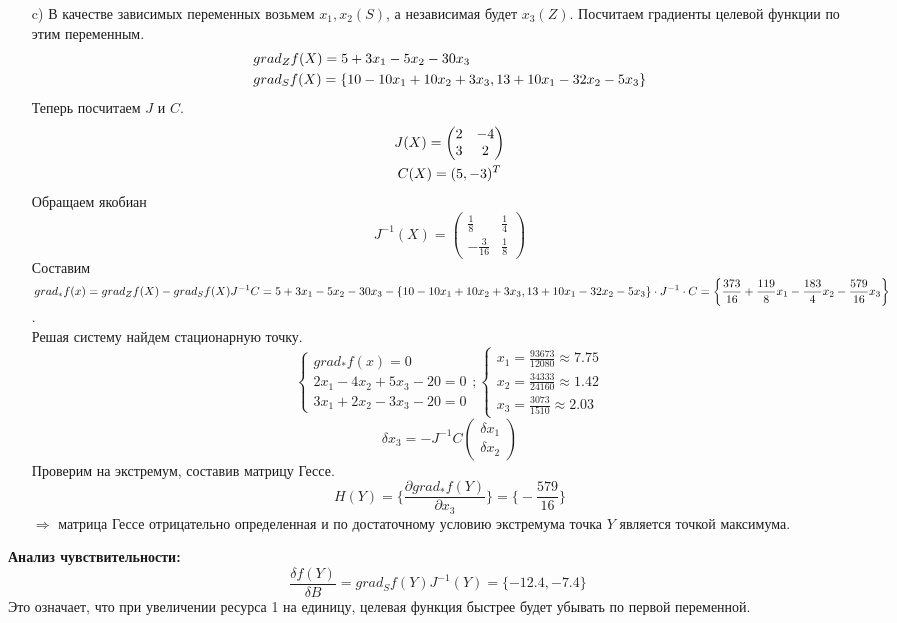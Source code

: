 \documentclass[12pt]{article}
\begin{document}
\begin{enumerate}
\item[c)] В качестве зависимых переменных возьмем $x_1,x_2(S)$, а независимая будет $x_3(Z)$. Посчитаем градиенты целевой функции по этим переменным.
\begin{align}
  &grad_Zf(X)=5+3x_1-5x_2-30x_3\\
  &grad_Sf(X)=\{10-10x_1+10x_2+3x_3,13+10x_1-32x_2-5x_3\}\notag
\end{align}
Теперь посчитаем $J$ и $C$.
\begin{gather}
  J(X)=\begin{pmatrix}
    2&-4\\3&2
  \end{pmatrix}\\
  C(X)=(5,-3)^T\notag
\end{gather}
Обращаем якобиан
\begin{equation}
  J^{-1}(X)=\begin{pmatrix}
    \frac{1}{8}&\frac{1}{4}\\
    -\frac{3}{16}&\frac{1}{8}
  \end{pmatrix}
\end{equation}
Составим $\displaystyle grad_{*}f(x)=grad_Zf(X)-grad_Sf(X)J^{-1}C=\\
5+3x_1-5x_2-30x_3-\{10-10x_1+10x_2+3x_3,13+10x_1-32x_2-5x_3\}\cdot J^{-1}\cdot C=\bigg\{\frac{373}{16}+\frac{119}{8}x_1-\frac{183}{4}x_2-
\frac{579}{16}x_3\bigg\}$.\\
Решая систему найдем стационарную точку.
\begin{equation}
  \begin{cases}
    grad_{*}f(x)=0\\
    2x_1-4x_2+5x_3-20=0\\
    3x_1+2x_2-3x_3-20=0
  \end{cases};
  \begin{cases}
    x_1=\frac{93673}{12080}\approx 7.75\\
    x_2=\frac{34333}{24160}\approx 1.42\\
    x_3=\frac{3073}{1510}\approx 2.03
  \end{cases}
\end{equation}
\begin{equation}
  \delta x_3=-J^{-1}C\begin{pmatrix}
    \delta x_1\\\delta x_2
\end{pmatrix}
\end{equation}
Проверим на экстремум, составив матрицу Гессе.
\begin{equation}
  H(Y)=\bigg\{\dfrac{\partial grad_{*}f(Y)}{\partial x_3}\bigg\}=\bigg\{-\dfrac{579}{16}\bigg\}
\end{equation}
$\Rightarrow$ матрица Гессе отрицательно определенная и по достаточному условию экстремума точка $Y$ является точкой максимума.
\end{enumerate}
\textbf{Анализ чувствительности:}\\
\begin{equation}
    \dfrac{\delta f(Y)}{\delta B}=grad_{S}f(Y)J^{-1}(Y)=\{-12.4,-7.4\}
\end{equation}
Это означает, что при увеличении ресурса 1 на единицу, целевая функция быстрее будет убывать по первой переменной.
\end{document}
